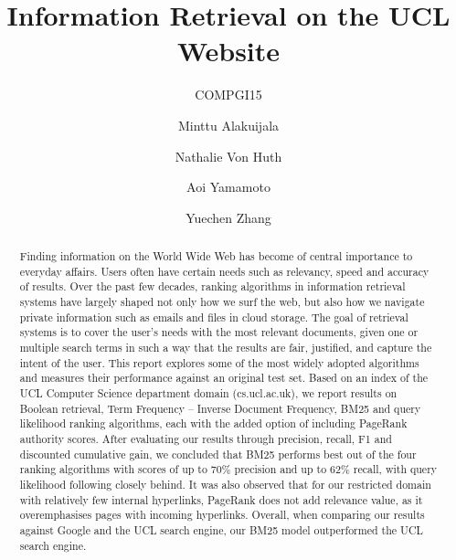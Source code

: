 \documentclass[sigconf]{acmart}
\begin{document}
\title{Information Retrieval on the UCL Website}
\subtitle{COMPGI15}


\author{Minttu Alakuijala}
\affiliation{\institution{}}

\author{Nathalie Von Huth}
\affiliation{\institution{}}

\author{Aoi Yamamoto}
\affiliation{\institution{}}

\author{Yuechen Zhang}
\affiliation{\institution{}}



\begin{abstract}

Finding information on the World Wide Web has become of central importance to everyday affairs. Users often have certain needs such as relevancy, speed and accuracy of results. Over the past few decades, ranking algorithms in information retrieval systems have largely shaped not only how we surf the web, but also how we navigate private information such as emails and files in cloud storage. The goal of retrieval systems is to cover the user's needs with the most relevant documents, given one or multiple search terms in such a way that the results are fair, justified, and capture the intent of the user. This report explores some of the most widely adopted algorithms and measures their performance against an original test set. Based on an index of the UCL Computer Science department domain (cs.ucl.ac.uk), we report results on Boolean retrieval, Term Frequency -- Inverse Document Frequency, BM25 and query likelihood ranking algorithms, each with the added option of including PageRank authority scores. After evaluating our results through precision, recall, F1 and discounted cumulative gain, we concluded that BM25 performs best out of the four ranking algorithms with scores of up to 70\% precision and up to 62\% recall, with query likelihood following closely behind. It was also observed that for our restricted domain with relatively few internal hyperlinks, PageRank does not add relevance value, as it overemphasises pages with incoming hyperlinks. Overall, when comparing our results against Google and the UCL search engine, our BM25 model outperformed the UCL search engine.

\end{abstract}

\maketitle




 
\end{document}
